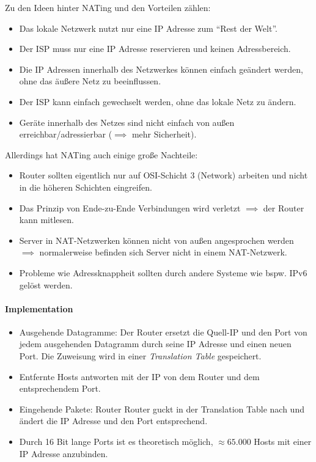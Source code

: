 \documentclass[a4paper, 11pt, accentcolor = tud3b]{tudreport}
\begin{document}
            Zu den Ideen hinter NATing und den Vorteilen zählen:
            \begin{itemize}
            	\item Das lokale Netzwerk nutzt nur eine IP Adresse zum \enquote{Rest der Welt}.
            	\item Der ISP muss nur eine IP Adresse reservieren und keinen Adressbereich.
            	\item Die IP Adressen innerhalb des Netzwerkes können einfach geändert werden, ohne das äußere Netz zu beeinflussen.
            	\item Der ISP kann einfach gewechselt werden, ohne das lokale Netz zu ändern.
            	\item Geräte innerhalb des Netzes sind nicht einfach von außen erreichbar/adressierbar (\( \implies \) mehr Sicherheit).
            \end{itemize}
            Allerdings hat NATing auch einige große Nachteile:
            \begin{itemize}
            	\item Router sollten eigentlich nur auf OSI-Schicht 3 (Network) arbeiten und nicht in die höheren Schichten eingreifen.
            	\item Das Prinzip von Ende-zu-Ende Verbindungen wird verletzt \( \implies \) der Router kann mitlesen.
            	\item Server in NAT-Netzwerken können nicht von außen angesprochen werden \( \implies \) normalerweise befinden sich Server nicht in einem NAT-Netzwerk.
            	\item Probleme wie Adressknappheit sollten durch andere Systeme wie bspw. IPv6 gelöst werden.
            \end{itemize}
            
            \paragraph{Implementation}
	            \begin{itemize}
	            	\item Ausgehende Datagramme: Der Router ersetzt die Quell-IP und den Port von jedem ausgehenden Datagramm durch seine IP Adresse und einen neuen Port. Die Zuweisung wird in einer \textit{Translation Table} gespeichert.
	            	\item Entfernte Hosts antworten mit der IP von dem Router und dem entsprechendem Port.
	            	\item Eingehende Pakete: Router Router guckt in der Translation Table nach und ändert die IP Adresse und den Port entsprechend.
	            	\item Durch 16 Bit lange Ports ist es theoretisch möglich, $ \approx 65.000 $ Hosts mit einer IP Adresse anzubinden.
	            \end{itemize}
\end{document}
